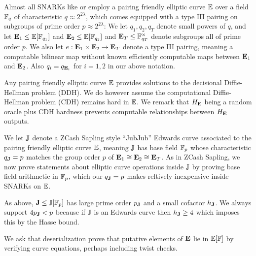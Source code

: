 \smallskip

Almost all SNARKs like \cite{Groth16} or \cite{plonk} employ a pairing friendly elliptic curve ${\mathbb{E}}$ over a field $\mathbb{F}_q$ of characteristic $q \approx 2^{2\lambda}$, which comes equipped with a type III pairing on subgroups of prime order $p \approx 2^{2\lambda}$:  We let $q_1,q_2,q_T$ denote small powers of $q$, and let ${\mathbf{E}}_1 \le {\mathbb{E}}[\mathbb{F}_{q_1}]$ and ${\mathbf{E}}_2 \le {\mathbb{E}}[\mathbb{F}_{q_2}]$ and ${\mathbf{E}}_T \le \mathbb{F}_{q_T}^\times$ denote subgroups all of prime order $p$.  We also let $e : {\mathbf{E}}_1 \times {\mathbf{E}}_2 \to {\mathbf{E}}_T$ denote a type III pairing, meaning a computable bilinear map without known efficiently computable maps between ${\mathbf{E}}_1$ and ${\mathbf{E}}_2$.  Also $q_i = q_{{\mathbf{E}}_i}$ for $i=1,2$ in our above notation.  

Any pairing friendly elliptic curve ${\mathbb{E}}$ provides solutions to the decisional Diffie-Hellman problem (DDH).  We do however assume the computational Diffie-Hellman problem (CDH) remains hard in ${\mathbb{E}}$.  We remark that $H_{\mathbf{E}}$ being a random oracle plus CDH hardness prevents computable relationships between $H_{\mathbf{E}}$ outputs.


\smallskip


We let ${\mathbb{J}}$ denote a ZCash Sapling style ``JubJub'' Edwards curve associated to the pairing friendly elliptic curve ${\mathbb{E}}$, meaning ${\mathbb{J}}$ has base field $\mathbb{F}_p$ whose characteristic $q_{{\mathbf{J}}} = p$ matches the group order $p$ of ${\mathbf{E}}_1 \cong {\mathbf{E}}_2 \cong {\mathbf{E}}_T$.  As in ZCash Sapling, we now prove statements about elliptic curve operations inside ${\mathbb{J}}$ by proving base field arithmetic in $\mathbb{F}_p$, which our $q_{{\mathbf{J}}} = p$ makes reltively inexpensive inside SNARKs on ${\mathbb{E}}$.

As above, ${\mathbf{J}} \le {\mathbb{J}}[\mathbb{F}_p]$ has large prime order $p_{{\mathbf{J}}}$ and a small cofactor $h_{{\mathbf{J}}}$.  We always support $4 p_{{\mathbf{J}}} < p$ because if ${\mathbb{J}}$ is an Edwards curve then $h_{{\mathbf{J}}} \ge 4$ which imposes this by the Hasse bound.

\smallskip

We ask that deserialization prove that putative elements of ${\mathbf{E}}$ lie in
${\mathbb{E}}[\mathbb{F}]$ by verifying curve equations, perhaps including twist checks.


